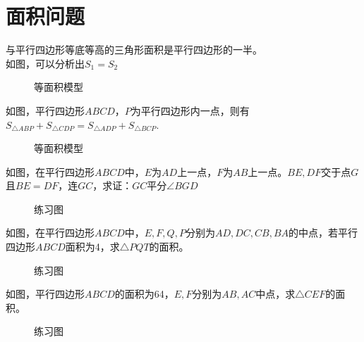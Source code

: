 \section{面积问题}
\begin{definition}
    与平行四边形等底等高的三角形面积是平行四边形的一半。\\
    如图，可以分析出$S_1=S_2$
\end{definition}
\begin{figure}[H]
    \centering
    \resizebox{3cm}{!}{}
    \caption{等面积模型}
\end{figure}
\begin{definition}
    如图，平行四边形$ABCD$，$P$为平行四边形内一点，则有$S_{\triangle ABP}+S_{\triangle CDP}=S_{\triangle ADP}+S_{\triangle BCP}.$
\end{definition}
\begin{figure}[H]
    \centering
    \resizebox{4cm}{!}{}
    \caption{等面积模型}
\end{figure}
\begin{problem}
如图，在平行四边形$ABCD$中，$E$为$AD$上一点，$F$为$AB$上一点。$BE,DF$交于点$G$且$BE=DF$，连$GC$，求证：$GC$平分$\angle BGD$
\end{problem}
\begin{figure}[H]
    \centering
    \resizebox{3cm}{!}{}
    \caption{练习图}
\end{figure}
\begin{problem}
如图，在平行四边形$𝐴𝐵𝐶𝐷$中，$𝐸,F,𝑄,𝑃$分别为$𝐴𝐷,𝐷𝐶,𝐶𝐵,𝐵𝐴$的中点，若平行四边形$𝐴𝐵𝐶𝐷$面积为4，求$\triangle 𝑃𝑄𝑇$的面积。
\end{problem}
\begin{figure}[H]
    \centering
    \resizebox{3cm}{!}{}
    \caption{练习图}
\end{figure}
\begin{problem}
如图，平行四边形$𝐴𝐵𝐶𝐷$的面积为64，$E,F$分别为$AB,AC$中点，求$\triangle CEF$的面积。
\end{problem}
\begin{figure}[H]
    \centering
    \resizebox{3cm}{!}{}
    \caption{练习图}
\end{figure}
